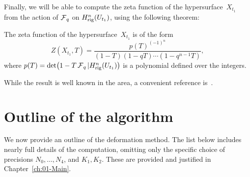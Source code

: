 Finally, we will be able to compute the zeta function of the 
hypersurface~$X_{t_1}$ from the action of $\operatorname{\mathcal{F}}_q$ on 
$H_{\text{rig}}^{n}(U_{t_1})$, using the following theorem:

\begin{thm}
The zeta function of the hypersurface~$X_{t_1}$ is of the form
\begin{equation*}
Z(X_{t_1},T) = \frac{p(T)^{(-1)^n}}{(1 - T) (1 - qT) \dotsm (1 - q^{n-1}T)},
\end{equation*}
where $p(T) = \det \bigl( 1 - T \operatorname{\mathcal{F}}_q | H_{\text{rig}}^n(U_{t_1}) \bigr)$ 
is a polynomial defined over the integers.
\end{thm}

While the result is well known in the area, a convenient reference 
is~\citep[Theorem~3.1]{Gerkmann2007}.


\section{Outline of the algorithm}

We now provide an outline of the deformation method.  The list below 
includes nearly full details of the computation, omitting only the 
specific choice of precisions $N_0, \dotsc, N_4$, and $K_1, K_2$.  
These are provided and justified in Chapter~\ref{ch:01-Main}.

